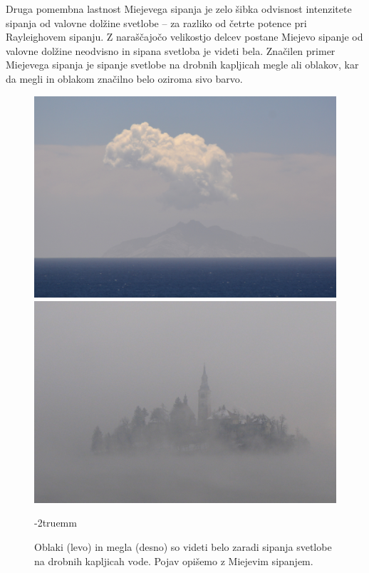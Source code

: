 Druga pomembna lastnost Miejevega sipanja je zelo šibka odvisnost intenzitete
sipanja od valovne dolžine svetlobe -- za razliko od četrte potence pri Rayleighovem
sipanju. Z naraščajočo velikostjo delcev postane Miejevo sipanje od valovne dolžine
neodvisno in sipana svetloba je videti bela. Značilen primer Miejevega 
sipanja je sipanje svetlobe na drobnih kapljicah megle ali oblakov, kar da 
megli in oblakom značilno belo oziroma sivo barvo.
\begin{figure}[!h]
\centering
\includegraphics[width=7truecm]{slike/07_oblak.jpg}\hfill
\includegraphics[width=7truecm]{slike/07_meglaB.jpg}
\caption{Oblaki (levo) in megla (desno) so videti belo zaradi sipanja svetlobe
na drobnih kapljicah vode. Pojav opišemo z Miejevim sipanjem.}
\label{fig:07_Mie}
\vglue-2truemm
\end{figure}


